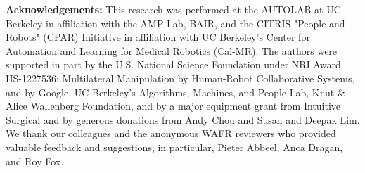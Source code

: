 \documentclass[Afour,sageh,times]{sagej}
\begin{document}
\vspace{0.5em}

{\footnotesize 
\noindent \textbf{Acknowledgements:}
This research was performed at the AUTOLAB at UC Berkeley in
affiliation with the AMP Lab, BAIR, and the CITRIS "People and Robots" (CPAR) Initiative in affiliation with UC Berkeley's Center for Automation and Learning for Medical Robotics (Cal-MR). The authors were supported in part by the U.S. National Science Foundation under NRI Award IIS-1227536: Multilateral Manipulation by Human-Robot Collaborative Systems, and by Google, UC Berkeley's Algorithms, Machines, and People Lab, Knut \& Alice Wallenberg Foundation, and by a major equipment grant from Intuitive Surgical and by generous donations from Andy Chou and Susan and Deepak Lim. We thank our colleagues and the anonymous WAFR reviewers who provided valuable feedback and suggestions, in particular, Pieter Abbeel, Anca Dragan, and Roy Fox.}






\clearpage
\appendix

\end{document}
